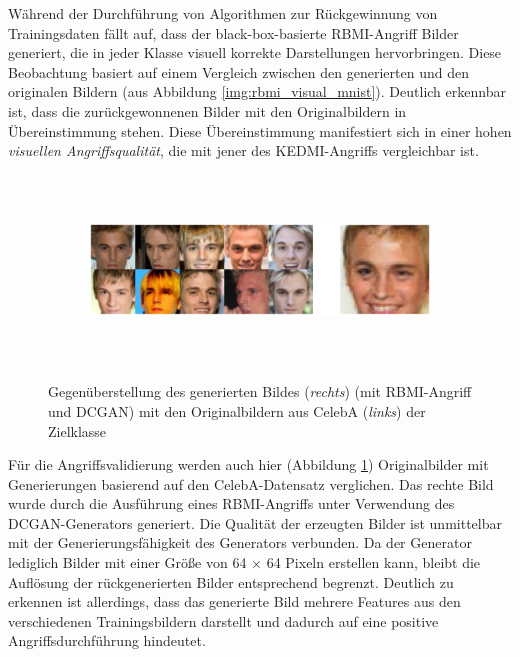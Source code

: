 Während der Durchführung von Algorithmen zur Rückgewinnung von Trainingsdaten fällt auf, dass der black-box-basierte \glqq RBMI\grqq-Angriff Bilder generiert, die in jeder Klasse visuell korrekte Darstellungen hervorbringen. Diese Beobachtung basiert auf einem Vergleich zwischen den generierten und den originalen Bildern (aus Abbildung \ref{img:rbmi_visual_mnist}). Deutlich erkennbar ist, dass die zurückgewonnenen Bilder mit den Originalbildern in Übereinstimmung stehen. Diese Übereinstimmung manifestiert sich in einer hohen \textit{visuellen Angriffsqualität}, die mit jener des \glqq KEDMI\grqq-Angriffs vergleichbar ist.

\begin{figure}[H]
	\centering
	\begin{subfigure}[b]{0.8\linewidth}
		\includegraphics[width=\linewidth, height=5cm, keepaspectratio]{Bilder/0_celeba_rbmi.png}
	\end{subfigure}
	\caption{Gegenüberstellung des generierten Bildes (\textit{rechts}) (mit \glqq RBMI\grqq-Angriff und DCGAN) mit den Originalbildern aus CelebA (\textit{links}) der Zielklasse}
	\label{img:rbmi_visual}
\end{figure}

Für die Angriffsvalidierung werden auch hier (Abbildung \ref{img:rbmi_visual}) Originalbilder mit Generierungen basierend auf den CelebA-Datensatz verglichen. Das rechte Bild wurde durch die Ausführung eines \glqq RBMI\grqq-Angriffs unter Verwendung des DCGAN-Generators generiert. Die Qualität der erzeugten Bilder ist unmittelbar mit der Generierungsfähigkeit des Generators verbunden. Da der Generator lediglich Bilder mit einer Größe von 64 $\times$ 64 Pixeln erstellen kann, bleibt die Auflösung der rückgenerierten Bilder entsprechend begrenzt. Deutlich zu erkennen ist allerdings, dass das generierte Bild mehrere Features aus den verschiedenen Trainingsbildern darstellt und dadurch auf eine positive Angriffsdurchführung hindeutet.


